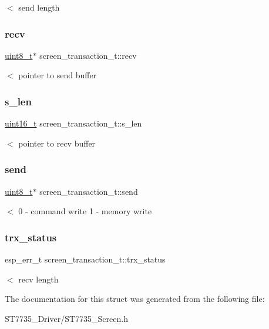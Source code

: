 $<$ send length \mbox{\label{structscreen__transaction__t_ac00eeb10dbec656aeb6d4cd81bc4533c}} 
\subsubsection{\texorpdfstring{recv}{recv}}
{\footnotesize\ttfamily \hyperlink{vl53l0x__types_8h_aba7bc1797add20fe3efdf37ced1182c5}{uint8\+\_\+t}$\ast$ screen\+\_\+transaction\+\_\+t\+::recv}

$<$ pointer to send buffer \mbox{\label{structscreen__transaction__t_ade485ce9cfd695b682aa0827ef8dd8ce}} 
\subsubsection{\texorpdfstring{s\+\_\+len}{s\_len}}
{\footnotesize\ttfamily \hyperlink{vl53l0x__types_8h_a273cf69d639a59973b6019625df33e30}{uint16\+\_\+t} screen\+\_\+transaction\+\_\+t\+::s\+\_\+len}

$<$ pointer to recv buffer \mbox{\label{structscreen__transaction__t_ad61b850a61304532df31ac1699b71911}} 
\subsubsection{\texorpdfstring{send}{send}}
{\footnotesize\ttfamily \hyperlink{vl53l0x__types_8h_aba7bc1797add20fe3efdf37ced1182c5}{uint8\+\_\+t}$\ast$ screen\+\_\+transaction\+\_\+t\+::send}

$<$ 0 -\/ command write 1 -\/ memory write \mbox{\label{structscreen__transaction__t_a1ee2e2ae378bc746fb656a0d5ec31d8b}} 
\subsubsection{\texorpdfstring{trx\+\_\+status}{trx\_status}}
{\footnotesize\ttfamily esp\+\_\+err\+\_\+t screen\+\_\+transaction\+\_\+t\+::trx\+\_\+status}

$<$ recv length 

The documentation for this struct was generated from the following file\+:\begin{DoxyCompactItemize}
\item 
S\+T7735\+\_\+\+Driver/S\+T7735\+\_\+\+Screen.\+h\end{DoxyCompactItemize}
